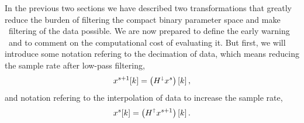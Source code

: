 In the previous two sections we have described two transformations that greatly
reduce the burden of filtering the compact binary parameter space and make \TD\
filtering of the data possible.  We are now prepared to define the early
warning \SNR\ and to comment on the computational cost of evaluating it.  But
first, we will introduce some notation refering to the decimation of data,
which means reducing the sample rate after low-pass filtering,
\begin{equation}
\label{eq:decomp}
	x^{s+1}[k] = \left( H^\shortdownarrow x^s\right)[k] \,,
\end{equation}
and notation refering to the interpolation of data to increase the sample rate,
\begin{equation}
	x^{s}[k] = \left( H^\shortuparrow x^{s+1}\right)[k] \,.
\end{equation}

